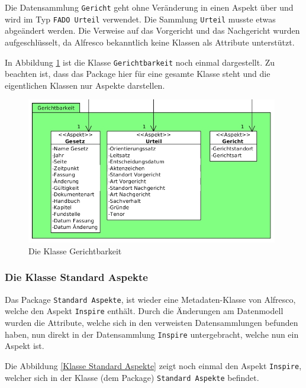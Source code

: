 Die Datensammlung \texttt{Gericht} geht ohne Ver\"anderung in einen Aspekt \"uber und wird im Typ \texttt{FADO Urteil} verwendet. Die Sammlung \texttt{Urteil} musste etwas abge\"andert werden. Die Verweise auf das Vorgericht und das Nachgericht wurden aufgeschl\"usselt, da Alfresco bekanntlich keine Klassen als Attribute unterst\"utzt.

In Abbildung \ref{Klasse Gerichtbarkeit} ist die Klasse \texttt{Gerichtbarkeit} noch einmal dargestellt. Zu beachten ist, dass das Package hier f\"ur eine gesamte Klasse steht und die eigentlichen Klassen nur Aspekte darstellen.

\begin{figure}[!ht]
\centering
\includegraphics[width=11cm]{Bilder/AlfrescoModell/Gerichtbarkeit.jpg}
\caption{Die Klasse Gerichtbarkeit}
\label{Klasse Gerichtbarkeit}
\centering
\end{figure}

\FloatBarrier
\subsubsection{Die Klasse Standard Aspekte}\label{Die Klasse Standard Aspekte}
Das Package \texttt{Standard Aspekte}, ist wieder eine Metadaten-Klasse von Alfresco, welche den Aspekt \texttt{Inspire} enth\"alt. Durch die \"Anderungen am Datenmodell wurden die Attribute, welche sich in den verweisten Datensammlungen befunden haben, nun direkt in der Datensammlung \texttt{Inspire} untergebracht, welche nun ein Aspekt ist. 

Die Abbildung \ref{Klasse Standard Aspekte} zeigt noch einmal den Aspekt \texttt{Inspire}, welcher sich in der Klasse (dem Package) \texttt{Standard Aspekte} befindet.

